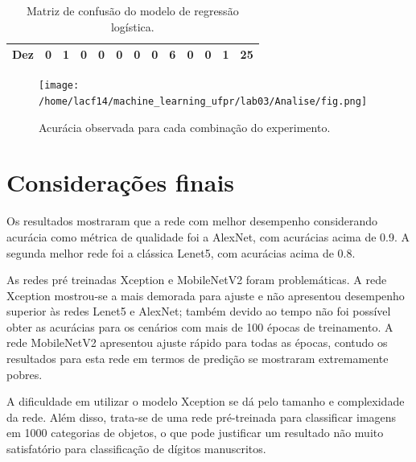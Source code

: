 \documentclass[
	12pt,				%
	openright,			%
	twoside,			%
	a4paper,			%
	english,			%
	brazil,				%
	svgnames
	]{abntex2}\usepackage[]{graphicx}\usepackage[]{color}
\begin{document}
\begin{table}[h]
\begin{tabular}{c|cccccccccccc}
\textbf{Dez} & 0                                & 1                                & 0                                & 0                                & 0                               & 0                               & 0                                & 6                                & 0                                & 0                                & \multicolumn{1}{c|}{1}          & \multicolumn{1}{c|}{\textbf{25}} \\ \hline
\end{tabular}
\caption{Matriz de confusão do modelo de regressão logística.}
\label{tab:my-table}
\end{table}


\begin{landscape}

\begin{figure}[]
\label{fig:fig1}
\centering
\texttt{[image: /home/lacf14/machine\_learning\_ufpr/lab03/Analise/fig.png]}
\caption{Acurácia observada para cada combinação do experimento.}
\end{figure}
\end{landscape}

\chapter{Considerações finais}
\label{cap:conclusao}


Os resultados mostraram que a rede com melhor desempenho considerando acurácia como métrica de qualidade foi a AlexNet, com acurácias acima de 0.9. A segunda melhor rede foi a clássica Lenet5, com acurácias acima de 0.8. 

As redes pré treinadas Xception e MobileNetV2 foram problemáticas. A rede Xception mostrou-se a mais demorada para ajuste e não apresentou desempenho superior às redes Lenet5 e AlexNet; também devido ao tempo não foi possível obter as acurácias para os cenários com mais de 100 épocas de treinamento. A rede MobileNetV2 apresentou ajuste rápido para todas as épocas, contudo os resultados para esta rede em termos de predição se mostraram extremamente pobres.

A dificuldade em utilizar o modelo Xception se dá pelo tamanho e complexidade da rede. Além disso, trata-se de uma rede pré-treinada para classificar imagens em 1000 categorias de objetos, o que pode justificar um resultado não muito satisfatório para classificação de dígitos manuscritos.
\end{document}
